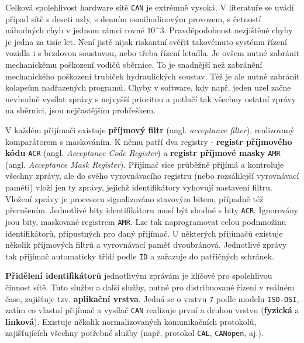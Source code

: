         Celková spolehlivost hardware sítě \texttt{CAN} je extrémně vysoká. V literatuře se uvádí 
        případ sítě s deseti uzly, s denním osmihodinovým provozem, s četností náhodných chyb v 
        jednom rámci rovné \(10^-3\). Pravděpodobnost nezjištěné chyby je jedna za tisíc let. Není 
        jistě nijak riskantní svěřit takovémuto systému řízení vozidla i s brzdovou soustavou, nebo 
        třeba řízení letadla. Je ovšem nutné zabránit mechanickému poškození vodičů sběrnice. To je 
        snadnější než zabránění mechanického poškození trubiček hydraulických soustav. Též je ale 
        nutné zabránit kolapsům nadřazených programů. Chyby v software, kdy např. jeden uzel začne 
        nevhodně vysílat zprávy s nejvyšší prioritou a potlačí tak všechny ostatní zprávy na 
        sběrnici, jsou nejčastějším prohřeškem.
        
        V každém přijímači existuje \textbf{příjmový filtr} (angl. \emph{acceptance filter}), 
        realizovaný komparátorem s maskováním. K němu patří dva registry - \textbf{registr 
        příjmového kódu} \texttt{ACR} (angl. \emph{Acceptance Code Register}) a \textbf{registr 
        příjmové masky} \texttt{AMR} (angl. \emph{Acceptance Mask Register}). Přijímač sice 
        průběžně přijímá a kontroluje všechny zprávy, ale do svého vyrovnávacího registru (nebo 
        rozsáhlejší vyrovnávací paměti) vloží jen ty zprávy, jejichž identifikátory vyhovují 
        nastavení filtru. Vložení zprávy je procesoru signalizováno stavovým bitem, 
        případně též přerušením. Jednotlivé bity identifikátoru musí být shodné s bity 
        \texttt{ACR}. Ignorovány jsou bity, maskované registrem \texttt{AMR}. Lze tak naprogramovat 
        celou podmnožinu identifikátorů, přípustných pro daný přijímač. U některých přijímačů 
        existuje několik příjmových filtrů a vyrovnávací paměť dvoubránová. Jednotlivé zprávy tak 
        přijímač automaticky třídí podle \texttt{ID} a zařazuje do patřičných schránek.
        
        \textbf{Přidělení identifikátorů} jednotlivým zprávám je klíčové pro spolehlivou činnost 
        sítě. Tuto službu a další služby, nutné pro distribuované řízení v reálném čase, zajišťuje 
        tzv. \textbf{aplikační vrstva}. Jedná se o vrstvu \texttt{7} podle modelu \texttt{ISO-OSI}, 
        zatím co vlastní přijímač a vysílač \texttt{CAN} realizuje první a druhou vrstvu 
        (\textbf{fyzická} a \textbf{linková}). Existuje několik normalizovaných komunikačních 
        protokolů, zajišťujících všechny potřebné služby (např. protokol \texttt{CAL}, 
        \texttt{CANopen}, aj.).       
        

